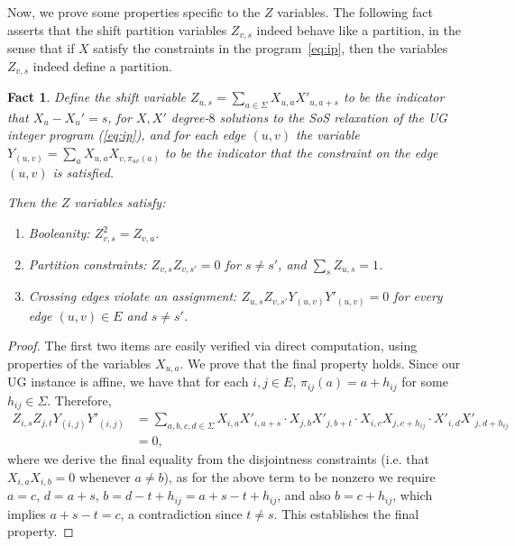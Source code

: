 \documentclass[11pt]{article}
\def \sos {SoS\xspace}
\newtheorem{fact}[theorem]{Fact}
\theoremstyle{definition}
\begin{document}
Now, we prove some properties specific to the $Z$ variables. 
The following fact asserts that the shift partition variables 
$Z_{v,s}$ indeed behave like a partition, in the sense 
that if $X$ satisfy the constraints in the program~\ref{eq:ip}, 
then the variables $Z_{v,s}$ indeed define a partition.
\begin{fact}\label{fact:z-vars}
Define the shift variable $Z_{u,s} = \sum_{a \in \Sigma} X_{u,a}X'_{u,a+s}$ to be the indicator that $X_u - X_u' = s$, for $X,X'$ degree-$8$ solutions to the \sos relaxation of the UG integer program (\ref{eq:ip}), and for each edge $(u,v)$ the variable $Y_{(u,v)} = \sum_{a} X_{u,a} X_{v, \pi_{uv}(a)}$ to be the indicator that the constraint on the edge $(u,v)$ is satisfied.

Then the $Z$ variables satisfy:
\begin{enumerate}
\item Booleanity: $Z_{v,s}^2 = Z_{v,a}$. 
\item Partition constraints: $Z_{v,s}Z_{v,s'} = 0$ for $s \neq s'$, and $\sum_{s} Z_{u,s} = 1$.
\item Crossing edges violate an assignment: $Z_{u,s} Z_{v,s'} Y_{(u,v)} Y'_{(u,v)} = 0$ for every edge $(u,v) \in E$ and $s \neq s'$. 
\end{enumerate}
\end{fact}
\begin{proof}
The first two items are easily verified via direct computation, using properties of the variables $X_{u,a}$.
We prove that the final property holds.
Since our UG instance is affine, we have that for each $i,j \in E$, $\pi_{ij}(a) = a + h_{ij}$ for some $h_{ij} \in \Sigma$.
 Therefore,
 \begin{align*}
 Z_{i,s} Z_{j,t}Y_{(i,j)}Y'_{(i,j)}
 &= \sum_{a,b,c,d \in \Sigma} X_{i,a}X'_{i,a+s} \cdot X_{j,b}X'_{j,b+t} \cdot X_{i,c}X_{j,c + h_{ij}} \cdot X'_{i,d} X'_{j,d+h_{ij}}\\
 &= 0,
 \end{align*}
 where we derive the final equality from the disjointness constraints (i.e. that $X_{i,a}X_{i,b} = 0$ whenever $a \neq b$), as for the above term to be nonzero we require $a = c$, $d = a + s$, $b = d - t + h_{ij} = a + s - t + h_{ij}$, and also $b = c + h_{ij}$, which implies $a + s - t = c$, a contradiction since $t \neq s$.
This establishes the final property.
\end{proof}
\end{document}
